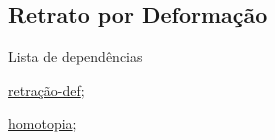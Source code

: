 \subsection{Retrato por Deformação}
\label{retrato-por-deformação-def}
\begin{titlemize}{Lista de dependências}
	\item \hyperref[retração-def]{retração-def};\\ %
	\item \hyperref[homotopia]{homotopia};\\
\end{titlemize}
